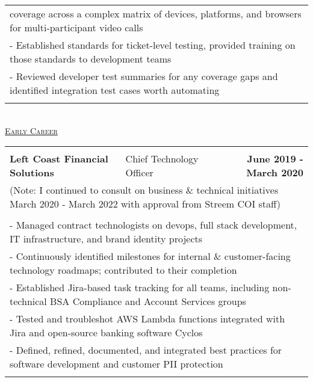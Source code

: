 \documentclass[letterpaper]{article}
\begin{document}
\begin{center}
\begin{tabular}{p{}p{}r}
				\multicolumn{3}{p{\textwidth}}{\quad\quad\quad  coverage across a complex matrix of devices, platforms, and browsers for multi-participant video calls }
			\\
				\multicolumn{3}{p{\textwidth}}{\quad\quad - Established standards for ticket-level testing, provided training on those standards to development teams}
			\\
				\multicolumn{3}{p{\textwidth}}{\quad\quad - Reviewed developer test summaries for any coverage gaps and identified integration test cases worth automating}
			\\
			\\
		\end{tabular} \\
		\vspace{2.25in}
		\underline{\large \scshape Early Career}
		\begin{tabular}{p{}p{}r}
		\\
			\\
				\textbf{Left Coast Financial Solutions} &
				\quad\quad\quad\quad\quad Chief Technology Officer &
				\textbf{June 2019 - March 2020\quad}
			\\
				\multicolumn{3}{p{\textwidth}}{(Note: I continued to consult on business \& technical initiatives March 2020 - March 2022 with approval from Streem COI staff)}
			\\
			\\
				\multicolumn{3}{p{\textwidth}}{\quad\quad - Managed contract technologists on devops, full stack development, IT infrastructure, and brand identity projects} 
			\\
				\multicolumn{3}{p{\textwidth}}{\quad\quad - Continuously identified milestones for internal \& customer-facing technology roadmaps; contributed to their completion}  
			\\
				\multicolumn{3}{p{\textwidth}}{\quad\quad - Established Jira-based task tracking for all teams, including non-technical BSA Compliance and Account Services groups}
			\\
				\multicolumn{3}{p{\textwidth}}{\quad\quad - Tested and troubleshot AWS Lambda functions integrated with Jira and open-source banking software Cyclos} 
			\\
				\multicolumn{3}{p{\textwidth}}{\quad\quad - Defined, refined, documented, and integrated best practices for software development and customer PII protection}
			\\
			\\

\end{tabular}
\end{center}
\end{document}
